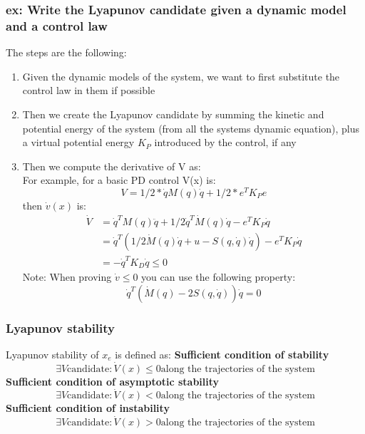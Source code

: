 \documentclass[a4paper,12pt]{article}
\begin{document}
\subsubsection{ex: Write the Lyapunov candidate given a dynamic model and a control law}
The steps are the following:
\begin{enumerate}
    \item Given the dynamic models of the system, we want 
    to first substitute the control law in them if possible
    \item Then we create the Lyapunov candidate by summing 
    the kinetic and potential energy of the system 
    (from all the systems dynamic equation), plus a virtual potential energy
    $K_P$ introduced by the control, if any 
    \item Then we compute the derivative of V as:\\
    For example, for a basic PD control V(x) is:
    \begin{equation}
        V=1/2*\dot{q}M(q)\dot{q}+1/2*e^TK_Pe
    \end{equation}
    then $\dot{v}(x)$ is:
    \begin{equation}
    \begin{split}
        \dot{V} & = \dot{q}^TM(q)\ddot{q}+ 1/2 \dot{q}^T\dot{M}(q)\dot{q} - e^TK_P\dot{q}\\
        & = \dot{q}^T(1/2\dot{M}(q)\dot{q}+u-S(q,\dot{q})\dot{q}) - e^TK_P\dot{q}\\
        & = -\dot{q}^TK_D\dot{q} \leq 0
    \end{split}
    \end{equation}
    Note: When proving $\dot{v} \leq 0$ you can use the following property:
    \begin{equation}
        \dot{q}^T(\dot{M}(q)-2S(q,\dot{q}))\dot{q}=0
    \end{equation}
\end{enumerate}
    \subsubsection{Lyapunov stability}
Lyapunov stability of $x_e$ is defined as:\newline
\textbf{Sufficient condition of stability}
\begin{equation}
    \exists V \text{candidate} : \dot{V}(x) \leq 0 \text{along the trajectories of the system}
\end{equation}
\textbf{Sufficient condition of asymptotic stability}
\begin{equation}
    \exists V \text{candidate} : \dot{V}(x) < 0 \text{along the trajectories of the system}
\end{equation}
\textbf{Sufficient condition of instability}
\begin{equation}
    \exists V \text{candidate} : \dot{V}(x) > 0 \text{along the trajectories of the system}
\end{equation}
\end{document}
